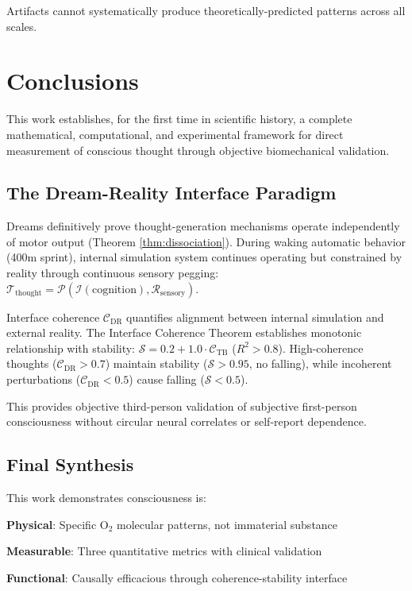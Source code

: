 \documentclass[11pt,onecolumn]{article}
\begin{document}
Artifacts cannot systematically produce theoretically-predicted patterns across all scales.

\section{Conclusions}

This work establishes, for the first time in scientific history, a complete mathematical, computational, and experimental framework for direct measurement of conscious thought through objective biomechanical validation.


\subsection{The Dream-Reality Interface Paradigm}

Dreams definitively prove thought-generation mechanisms operate independently of motor output (Theorem \ref{thm:dissociation}). During waking automatic behavior (400m sprint), internal simulation system continues operating but constrained by reality through continuous sensory pegging: $\mathcal{T}_{\text{thought}} = \mathcal{P}(\mathcal{I}(\text{cognition}), \mathcal{R}_{\text{sensory}})$.

Interface coherence $\mathcal{C}_{\text{DR}}$ quantifies alignment between internal simulation and external reality. The Interface Coherence Theorem establishes monotonic relationship with stability: $\mathcal{S} = 0.2 + 1.0 \cdot \mathcal{C}_{\text{TB}}$ ($R^2 > 0.8$). High-coherence thoughts ($\mathcal{C}_{\text{DR}} > 0.7$) maintain stability ($\mathcal{S} > 0.95$, no falling), while incoherent perturbations ($\mathcal{C}_{\text{DR}} < 0.5$) cause falling ($\mathcal{S} < 0.5$).

This provides objective third-person validation of subjective first-person consciousness without circular neural correlates or self-report dependence.


\subsection{Final Synthesis}

This work demonstrates consciousness is:

\textbf{Physical}: Specific O$_2$ molecular patterns, not immaterial substance

\textbf{Measurable}: Three quantitative metrics with clinical validation

\textbf{Functional}: Causally efficacious through coherence-stability interface
\end{document}
